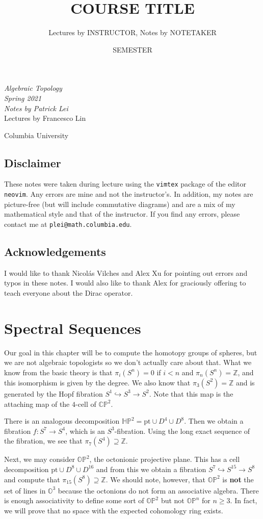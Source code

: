 \documentclass[leqno, openany]{memoir}
\title{COURSE TITLE}
\author{Lectures by INSTRUCTOR, Notes by NOTETAKER}
\date{SEMESTER}
\theoremstyle{definition}
\theoremstyle{remark}
\theoremstyle{plain}
\theoremstyle{definition}
\theoremstyle{remark}
\renewcommand{\H}{\mathbb{H}}
\newcommand{\C}{\mathbb{C}}
\newcommand{\Z}{\mathbb{Z}}
\renewcommand{\P}{\mathbb{P}}
\newcommand{\mr}[1]{\mathrm{#1}}
\newcommand*{\titleSW}
    {\begingroup%
    \raggedleft
    \vspace*{\baselineskip}
    {\Huge\itshape Algebraic Topology \\ Spring 2021}\\[\baselineskip]
    {\large\itshape Notes by Patrick Lei}\\[0.2\textheight]
    {\Large Lectures by Francesco Lin}\par
    \vfill
    {\Large \sffamily Columbia University}
    \vspace*{\baselineskip}
\endgroup}
\begin{document}
    
\begin{titlingpage}
\titleSW
\end{titlingpage}

\thispagestyle{empty}
\section*{Disclaimer}%
\label{sec:disclaimer}

These notes were taken during lecture using the \texttt{vimtex} package of the editor \texttt{neovim}. 
Any errors are mine and not the instructor's. 
In addition, my notes are picture-free (but will include commutative diagrams) and are a mix of my mathematical style and that of the instructor.
If you find any errors, please contact me at \texttt{plei@math.columbia.edu}.

\section*{Acknowledgements}%
\label{sec:acknowledgements}

I would like to thank Nicol\'as Vilches and Alex Xu for pointing out errors and typos in these notes. I would also like to thank Alex for graciously offering to teach everyone about the Dirac operator. 


\newpage


\tableofcontents

\chapter{Spectral Sequences}%
\label{cha:spectral_sequences}

Our goal in this chapter will be to compute the homotopy groups of spheres, but we are not algebraic topologists so we don't actually care about that. What we know from the basic theory is that $\pi_i(S^n) = 0$ if $i < n$ and $\pi_n(S^n) = \Z$, and this isomorphism is given by the degree. We also know that $\pi_3(S^2) = \Z$ and is generated by the Hopf fibration $S^1 \hookrightarrow S^3 \to S^2$. Note that this map is the attaching map of the $4$-cell of $\C\P^2$.

There is an analogous decomposition $\H\P^2 = \mr{pt} \cup D^4 \cup D^8$. Then we obtain a fibration $f \colon S^7 \to S^4$, which is an $S^3$-fibration. Using the long exact sequence of the fibration, we see that $\pi_7(S^4) \supseteq \Z$.

Next, we may consider $\mathbb{O}\P^2$, the octonionic projective plane. This has a cell decomposition $\mr{pt} \cup D^8 \cup D^{16}$ and from this we obtain a fibration $S^7 \hookrightarrow S^{15} \to S^8$ and compute that $\pi_{15}(S^8) \supseteq \Z$. We should note, however, that $\mathbb{O}\P^2$ is \textbf{not} the set of lines in $\mathbb{O}^3$ because the octonions do not form an associative algebra. There is enough associativity to define some sort of $\mathbb{O}\P^2$ but not $\mathbb{O}\P^n$ for $n \geq 3$. In fact, we will prove that no space with the expected cohomology ring exists.
\end{document}
